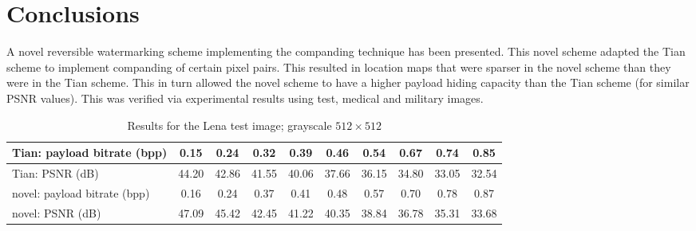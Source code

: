 \documentclass[10pt,twocolumn,letterpaper]{article}
\begin{document}
{%

\section{Conclusions}
\label{sec:conc}
A novel reversible watermarking scheme implementing
the companding technique has been presented. This novel scheme 
adapted the Tian scheme to implement companding of certain pixel 
pairs. This resulted in location maps that were sparser in the 
novel scheme than they were in the Tian scheme. This in turn
allowed the novel scheme to have a higher payload hiding capacity than the
Tian scheme (for similar PSNR values). This was verified via
experimental results using test, medical and military images.


\begin{table*}[!p]
\begin{center}
\begin{tabular}{|l|c|c|c|c|c|c|c|c|c|} \hline
Tian: payload bitrate (bpp) 	& 0.15 	& 0.24	& 0.32	& 0.39	& 0.46	& 0.54	& 0.67	& 0.74	& 0.85	\\ \hline
Tian: PSNR (dB)			& 44.20 & 42.86	& 41.55	& 40.06	& 37.66	& 36.15	& 34.80	& 33.05	& 32.54	\\ \hline \hline
novel: payload bitrate (bpp)	& 0.16 	& 0.24	& 0.37	& 0.41	& 0.48	& 0.57	& 0.70	& 0.78	& 0.87	\\ \hline
novel: PSNR (dB)		& 47.09	& 45.42	& 42.45	& 41.22	& 40.35	& 38.84	& 36.78	& 35.31	& 33.68	\\ \hline
\end{tabular}
\caption{Results for the Lena test image; grayscale $512\times 512$}
\label{tab:lena512}
\end{center}
\setlength{\abovecaptionskip}{0cm}
\end{table*}

}
\end{document}
